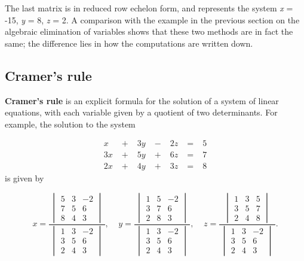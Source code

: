 The last matrix is in reduced row echelon form, and represents the system \textit{x} =
-15, \textit{y} = 8, \textit{z} = 2. A comparison with the example in the previous section
on the algebraic elimination of variables shows that these two methods are in fact the
same; the difference lies in how the computations are written down.




\subsection{Cramer's rule}
\label{sss:cram-e47e}




\textbf{Cramer's rule} is an explicit formula for the solution of a system of linear equations, with each variable given by a quotient of two determinants. For example, the solution to the system



\begin{align}
 x &\; + &\; 3y &\; - &\; 2z &\; = &\; 5 \\
 3x &\; + &\; 5y &\; + &\; 6z &\; = &\; 7 \\
 2x &\; + &\; 4y &\; + &\; 3z &\; = &\; 8
\end{align} is given by



$$ x=\frac {\, \begin{vmatrix}5 & 3 & -2 \\ 7 & 5 & 6 \\ 8 & 4 & 3\end{vmatrix} \,} {\, \begin{vmatrix}1 & 3 & -2 \\ 3 & 5 & 6 \\ 2 & 4 & 3\end{vmatrix} \,} ,\;\;\;\; y=\frac {\, \begin{vmatrix}1 & 5 & -2 \\ 3 & 7 & 6 \\ 2 & 8 & 3\end{vmatrix} \,} {\, \begin{vmatrix}1 & 3 & -2 \\ 3 & 5 & 6 \\ 2 & 4 & 3\end{vmatrix} \,} ,\;\;\;\; z=\frac {\, \begin{vmatrix}1 & 3 & 5 \\ 3 & 5 & 7 \\ 2 & 4 & 8\end{vmatrix} \,} {\, \begin{vmatrix}1 & 3 & -2 \\ 3 & 5 & 6 \\ 2 & 4 & 3\end{vmatrix} \,}. $$ 

